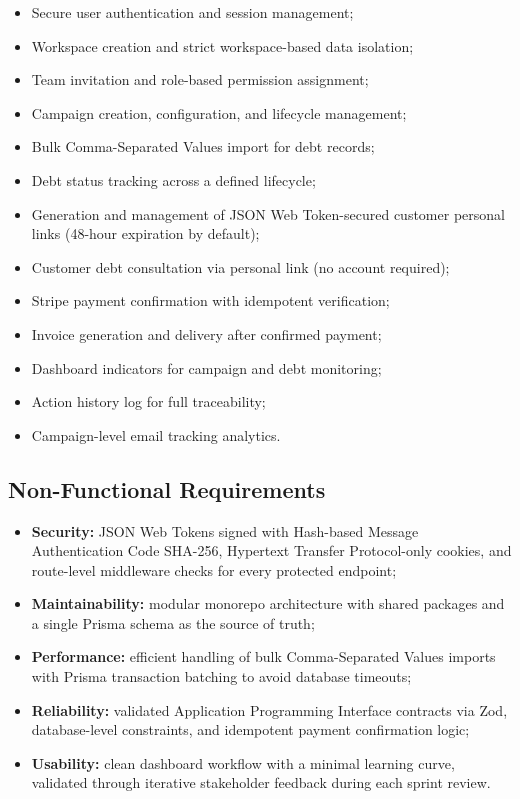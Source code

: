 \documentclass[12pt,a4paper]{report}
\begin{document}
\begin{itemize}
  \item Secure user authentication and session management;
  \item Workspace creation and strict workspace-based data isolation;
  \item Team invitation and role-based permission assignment;
  \item Campaign creation, configuration, and lifecycle management;
  \item Bulk Comma-Separated Values import for debt records;
  \item Debt status tracking across a defined lifecycle;
  \item Generation and management of JSON Web Token-secured customer personal links (48-hour expiration by default);
  \item Customer debt consultation via personal link (no account required);
  \item Stripe payment confirmation with idempotent verification;
  \item Invoice generation and delivery after confirmed payment;
  \item Dashboard indicators for campaign and debt monitoring;
  \item Action history log for full traceability;
  \item Campaign-level email tracking analytics.
\end{itemize}

\subsection{Non-Functional Requirements}

\begin{itemize}
  \item \textbf{Security:} JSON Web Tokens signed with Hash-based Message Authentication Code SHA-256, Hypertext Transfer Protocol-only cookies,
        and route-level middleware checks for every protected endpoint;
  \item \textbf{Maintainability:} modular monorepo architecture with shared packages
        and a single Prisma schema as the source of truth;
  \item \textbf{Performance:} efficient handling of bulk Comma-Separated Values imports with Prisma
        transaction batching to avoid database timeouts;
  \item \textbf{Reliability:} validated Application Programming Interface contracts via Zod, database-level constraints,
        and idempotent payment confirmation logic;
  \item \textbf{Usability:} clean dashboard workflow with a minimal learning curve,
        validated through iterative stakeholder feedback during each sprint review.
\end{itemize}
\end{document}
